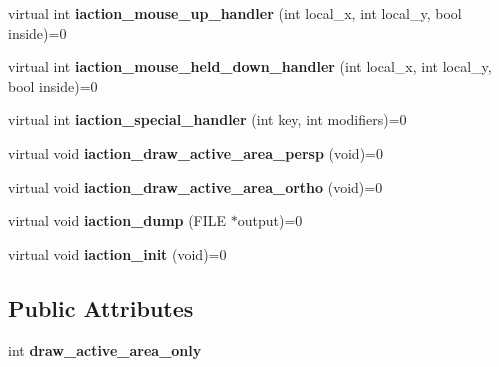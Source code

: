\begin{DoxyCompactItemize}
\item 
\hypertarget{classGLUI__Mouse__Interaction_aaeab42a0986281d21e2b3ab24efb527d}{virtual int {\bfseries iaction\-\_\-mouse\-\_\-up\-\_\-handler} (int local\-\_\-x, int local\-\_\-y, bool inside)=0}\label{classGLUI__Mouse__Interaction_aaeab42a0986281d21e2b3ab24efb527d}

\item 
\hypertarget{classGLUI__Mouse__Interaction_ab10a2bbd829a80e7403d722e4e3b480d}{virtual int {\bfseries iaction\-\_\-mouse\-\_\-held\-\_\-down\-\_\-handler} (int local\-\_\-x, int local\-\_\-y, bool inside)=0}\label{classGLUI__Mouse__Interaction_ab10a2bbd829a80e7403d722e4e3b480d}

\item 
\hypertarget{classGLUI__Mouse__Interaction_a738d6fd0afea5a76b45fe2a3c24c4e64}{virtual int {\bfseries iaction\-\_\-special\-\_\-handler} (int key, int modifiers)=0}\label{classGLUI__Mouse__Interaction_a738d6fd0afea5a76b45fe2a3c24c4e64}

\item 
\hypertarget{classGLUI__Mouse__Interaction_a4c7473fb5849e7d13052100aac56a9f3}{virtual void {\bfseries iaction\-\_\-draw\-\_\-active\-\_\-area\-\_\-persp} (void)=0}\label{classGLUI__Mouse__Interaction_a4c7473fb5849e7d13052100aac56a9f3}

\item 
\hypertarget{classGLUI__Mouse__Interaction_aba702d0d46375ab194c7b07d93051b0d}{virtual void {\bfseries iaction\-\_\-draw\-\_\-active\-\_\-area\-\_\-ortho} (void)=0}\label{classGLUI__Mouse__Interaction_aba702d0d46375ab194c7b07d93051b0d}

\item 
\hypertarget{classGLUI__Mouse__Interaction_a99dd43b2224bbfee6aadee3cf15c1fdd}{virtual void {\bfseries iaction\-\_\-dump} (F\-I\-L\-E $\ast$output)=0}\label{classGLUI__Mouse__Interaction_a99dd43b2224bbfee6aadee3cf15c1fdd}

\item 
\hypertarget{classGLUI__Mouse__Interaction_a4be4e3ae7948824b2af30c2b87f434fd}{virtual void {\bfseries iaction\-\_\-init} (void)=0}\label{classGLUI__Mouse__Interaction_a4be4e3ae7948824b2af30c2b87f434fd}

\end{DoxyCompactItemize}
\subsection*{Public Attributes}
\begin{DoxyCompactItemize}
\item 
\hypertarget{classGLUI__Mouse__Interaction_a1ac48da74085fbff71aab99f2e51b280}{int {\bfseries draw\-\_\-active\-\_\-area\-\_\-only}}\label{classGLUI__Mouse__Interaction_a1ac48da74085fbff71aab99f2e51b280}

\end{DoxyCompactItemize}
